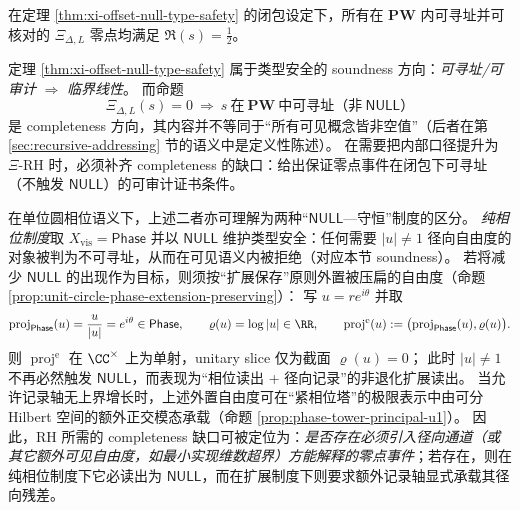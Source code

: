\begin{corollary}\label{cor:xi-visible-zeros-on-critical-line}
在定理 \ref{thm:xi-offset-null-type-safety} 的闭包设定下，所有在 \(\mathbf{PW}\) 内可寻址并可核对的 \(\Xi_{\Delta,L}\) 零点均满足 \(\Re(s)=\tfrac12\)。
\end{corollary}

\begin{remark}\label{rem:xi-soundness-vs-completeness}
定理 \ref{thm:xi-offset-null-type-safety} 属于类型安全的 soundness 方向：\emph{可寻址/可审计} \(\Rightarrow\) \emph{临界线性}。
而命题
\[
\Xi_{\Delta,L}(s)=0\ \Longrightarrow\ s\ \text{在}\ \mathbf{PW}\ \text{中可寻址（非}\ \mathsf{NULL}\text{）}
\]
是 completeness 方向，其内容并不等同于“所有可见概念皆非空值”（后者在第 \ref{sec:recursive-addressing} 节的语义中是定义性陈述）。
在需要把内部口径提升为 \(\Xi\)-RH 时，必须补齐 completeness 的缺口：给出保证零点事件在闭包下可寻址（不触发 \(\mathsf{NULL}\)）的可审计证书条件。
\par
在单位圆相位语义下，上述二者亦可理解为两种“\(\mathsf{NULL}\)---守恒”制度的区分。
\emph{纯相位制度}取 \(X_{\mathrm{vis}}=\mathsf{Phase}\) 并以 \(\mathsf{NULL}\) 维护类型安全：任何需要 \(|u|\neq 1\) 径向自由度的对象被判为不可寻址，从而在可见语义内被拒绝（对应本节 soundness）。
若将减少 \(\mathsf{NULL}\) 的出现作为目标，则须按“扩展保存”原则外置被压扁的自由度（命题 \ref{prop:unit-circle-phase-extension-preserving}）：
写 \(u=re^{i\theta}\) 并取
\[
\operatorname{proj}_{\mathsf{Phase}}(u)=\frac{u}{|u|}=e^{i\theta}\in\mathsf{Phase},
\qquad
\varrho(u)=\log|u|\in\RR,
\qquad
\operatorname{proj}^{\mathrm{e}}(u):=\bigl(\operatorname{proj}_{\mathsf{Phase}}(u),\varrho(u)\bigr).
\]
则 \(\operatorname{proj}^{\mathrm{e}}\) 在 \(\CC^\times\) 上为单射，unitary slice 仅为截面 \(\varrho(u)=0\)；
此时 \(|u|\neq 1\) 不再必然触发 \(\mathsf{NULL}\)，而表现为“相位读出 + 径向记录”的非退化扩展读出。
当允许记录轴无上界增长时，上述外置自由度可在“紧相位塔”的极限表示中由可分 Hilbert 空间的额外正交模态承载（命题 \ref{prop:phase-tower-principal-u1}）。
因此，RH 所需的 completeness 缺口可被定位为：\emph{是否存在必须引入径向通道（或其它额外可见自由度，如最小实现维数超界）方能解释的零点事件}；若存在，则在纯相位制度下它必读出为 \(\mathsf{NULL}\)，而在扩展制度下则要求额外记录轴显式承载其径向残差。
\end{remark}


